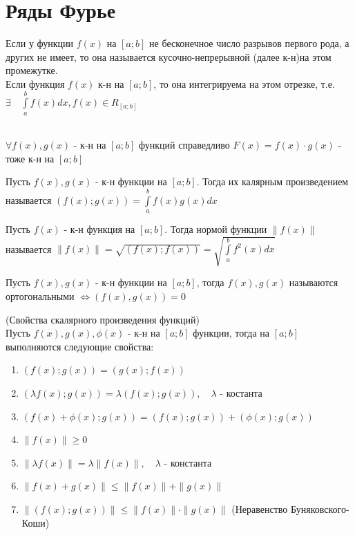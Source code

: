 \section{Ряды Фурье}

\begin{Def}
	Если у функции $f(x)$ на $[a;b]$ не бесконечное число разрывов первого рода, а других не имеет, то она называется кусочно-непрерывной (далее к-н)на этом промежутке.\\
	Если функция $f(x)$ к-н на $[a;b]$, то она интегрируема на этом отрезке, т.е. $\exists \quad \int\limits_{a}^{b}f(x)dx, f(x) \in R_[a;b]$
\end{Def}

\begin{Note}~\\
	$\forall f(x),g(x)$ - к-н на $[a;b]$ функций справедливо $F(x) = f(x) \cdot g(x)$ - тоже к-н на $[a;b]$
\end{Note}

\begin{Def}
	Пусть $f(x), g(x)$ - к-н функции на $[a;b]$. Тогда их калярным произведением называется $(f(x);g(x)) = \int\limits_{a}^{b}f(x)g(x)dx$
\end{Def}

\begin{Def}
	Пусть $f(x)$ - к-н функция на $[a;b]$. Тогда нормой функции $\|f(x)\|$ называется $\|f(x)\| = \sqrt{(f(x);f(x))} = \sqrt{\int\limits_{a}^{b}f^2(x)dx}$
\end{Def}

\begin{Def}
	Пусть $f(x), g(x)$ - к-н функции на $[a;b]$, тогда $f(x), g(x)$ называются ортогональными $\Leftrightarrow (f(x),g(x)) = 0$ 
\end{Def}

\begin{Note}(Свойства скалярного произведения функций)\\
	Пусть $f(x), g(x), \phi(x)$ - к-н на $[a;b]$ функции, тогда на $[a;b]$ выполняются следующие свойства:
	\begin{enumerate}
		\item $(f(x);g(x)) = (g(x);f(x))$
		\item $(\lambda f(x);g(x)) = \lambda (f(x);g(x)), \quad \lambda$ - костанта
		\item $(f(x) + \phi (x); g(x)) = (f(x);g(x)) + (\phi (x); g(x))$
		\item $\|f(x)\| \geq 0$
		\item $\|\lambda f(x)\| = \lambda\|f(x)\|, \quad \lambda$ - константа
		\item $\|f(x)+g(x)\| \leq \|f(x)\| + \|g(x)\|$
		\item $\|(f(x);g(x))\| \leq \|f(x)\| \cdot \|g(x)\|$ (Неравенство Буняковского-Коши)
	\end{enumerate}
\end{Note}


